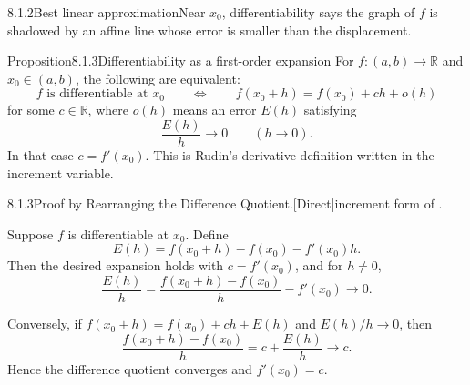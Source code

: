 \documentclass[main.tex]{subfiles}
\begin{document}
\begin{Fig}{8.1.2}{Best linear approximation}{Near $x_0$, differentiability says the
graph of $f$ is shadowed by an affine line whose error is smaller than the displacement.}
\end{Fig}

\begin{Obj}{Proposition}{8.1.3}{Differentiability as a first-order expansion}
For $f:(a,b)\to\mathbb R$ and $x_0\in(a,b)$, the following are equivalent:
\[
  f\text{ is differentiable at }x_0
  \qquad\Longleftrightarrow\qquad
  f(x_0+h)=f(x_0)+ch+o(h)
\]
for some $c\in\mathbb R$, where $o(h)$ means an error $E(h)$ satisfying
\[
  \frac{E(h)}{h}\longrightarrow0\qquad(h\to0).
\]
In that case $c=f'(x_0)$.
This is Rudin's derivative definition  written in the increment variable.
\end{Obj}

\begin{Prf}{8.1.3}{Proof by Rearranging the Difference Quotient.}{[Direct]\quad increment form of .}
\item Suppose $f$ is differentiable at $x_0$. Define
  \[
    E(h)=f(x_0+h)-f(x_0)-f'(x_0)h .
  \]
  Then the desired expansion holds with $c=f'(x_0)$, and for $h\ne0$,
  \[
    \frac{E(h)}{h}
    =
    \frac{f(x_0+h)-f(x_0)}{h}-f'(x_0)
    \longrightarrow0 .
  \]
\item Conversely, if $f(x_0+h)=f(x_0)+ch+E(h)$ and $E(h)/h\to0$, then
  \[
    \frac{f(x_0+h)-f(x_0)}{h}
    =
    c+\frac{E(h)}{h}
    \longrightarrow c .
  \]
  Hence the difference quotient converges and $f'(x_0)=c$.
\end{Prf}
\end{document}
